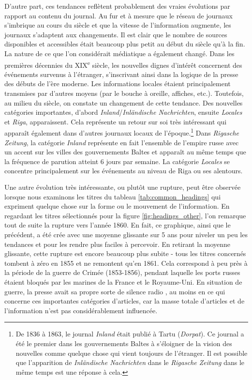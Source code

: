 \documentclass[a4paper,twoside,12pt]{article}
\begin{document}
D'autre part, ces tendances reflètent probablement des vraies évolutions par rapport au contenu du journal. Au fur et à mesure que le réseau de journaux s'imbrique au cours du siècle et que la vitesse de l'information augmente, les journaux s'adaptent aux changements. Il est clair que le nombre de sources disponibles et accessibles était beaucoup plus petit au début du siècle qu'à la fin. La nature de ce que l'on considérait \og médiatique \fg{} a également changé. Dans les premières décennies du XIX\textsuperscript{e} siècle, les nouvelles dignes d'intérêt concernent des événements survenus à l'étranger, s'inscrivant ainsi dans la logique de la presse des débuts de l'ère moderne. Les informations locales étaient principalement transmises par d'autres moyens (par le bouche à oreille, affiches, etc.). Toutefois, au milieu du siècle, on constate un changement de cette tendance. Des nouvelles catégories importantes, d'abord \textit{Inland}/\textit{Inländische Nachrichten}, ensuite \textit{Locales} et \textit{Riga}, apparaissent. Cela représente un \og retour sur soi \fg{} très intéressant qui apparaît également dans d'autres journaux locaux de l'époque.\footnote{De 1836 à 1863, le journal \textit{Inland} était publié à Tartu (\textit{Dorpat}). Ce journal a été le premier dans les gouvernements Baltes à s'éloigner de la vision des nouvelles comme quelque chose qui vient toujours de l'étranger. Il est possible que l'apparition de \textit{Inländische Nachrichten} dans le \textit{Rigasche Zeitung} dans le même temps est une réponse à cela.} Dans \textit{Rigasche Zeitung}, la catégorie \textit{Inland} représente en fait l'ensemble de l'empire russe avec un accent sur les villes des gouvernements Baltes et apparaît au même temps que la fréquence de parution atteint 6 jours par semaine. La catégorie \textit{Locales} se concentre principalement sur les événements au niveau de Riga ou ses alentours.

Une autre évolution très intéressante, ou plutôt une rupture, peut être observée lorsque nous examinons les titres du tableau \ref{tab:common_headings} qui expriment quelque chose sur la forme ou le mouvement de l'information. En regardant les titres sélectionnés pour la figure \ref{fig:headings_other}, l'on remarque tout de suite la rupture vers l'année 1860. En fait, ce graphique, ainsi que le précédent, a été crée avec une moyenne glissante sur 5 ans pour niveler un peu les tendances et pour les rendre plus faciles à percevoir. En retirant la moyenne glissante, cette rupture est encore beaucoup plus subite - tous les titres concernés tombent à zéro en 1855 et ne remontent qu'en 1861. Cela correspond à peu près à la période de la guerre de Crimée (1853-1856), pendant laquelle les ports russes étaient bloqués par les marines de la France et le Royaume-Uni. En situation de guerre, la presse avait sa propre sorte de \og silence radio \fg{}, au moins en ce qui concerne ces importantes catégories d'articles, car la masse totale d'articles et de l'information n'est pas considérablement influencée.
\end{document}
